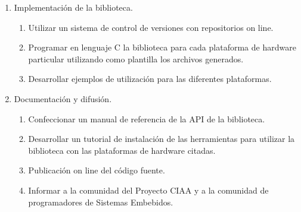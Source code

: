 \begin{enumerate}
\item Implementación de la biblioteca.
\begin{enumerate}
\item Utilizar un sistema de control de versiones con repositorios on line.
\item Programar en lenguaje C la biblioteca para cada plataforma de hardware particular utilizando como plantilla los archivos generados.
\item Desarrollar ejemplos de utilización para las diferentes plataformas.
\end{enumerate}
\item Documentación y difusión.
\begin{enumerate}
\item Confeccionar un manual de referencia de la API de la biblioteca.
\item Desarrollar un tutorial de instalación de las herramientas para utilizar la biblioteca con las plataformas de hardware citadas.
\item Publicación on line del código fuente.
\item Informar a la comunidad del Proyecto CIAA y a la comunidad de programadores de Sistemas Embebidos.
\end{enumerate}
\end{enumerate}

% 
% 

